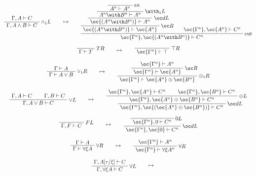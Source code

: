 \begin{gather*}
\\[2ex]
\AxRule{\Gamma,A\vdash C}
\LabelRule{\wedge_1 L}
\UnaRule{\Gamma,A\wedge B\vdash C}
\DisplayProof
\qquad\mapsto\qquad
\LabelRule{\rulename{ax}}
\NulRule{A^n\vdash A^n}
\LabelRule{\with_1 L}
\UnaRule{A^n\with B^n\vdash A^n}
\LabelRule{\oc d L}
\UnaRule{\oc{(A^n\with B^n)}\vdash A^n}
\LabelRule{\oc R}
\UnaRule{\oc{(A^n\with B^n)}\vdash \oc{A^n}}
\AxRule{\oc{\Gamma^n},\oc{A^n}\vdash C^n}
\LabelRule{\rulename{cut}}
\BinRule{\oc{\Gamma^n},\oc{(A^n\with B^n)}\vdash C^n}
\DisplayProof
\\[2ex]
\LabelRule{T R}
\NulRule{\Gamma\vdash T}
\DisplayProof
\qquad\mapsto\qquad
\LabelRule{\top R}
\NulRule{\oc{\Gamma^n}\vdash \top}
\DisplayProof
\\[2ex]
\AxRule{\Gamma\vdash A}
\LabelRule{\vee_1 R}
\UnaRule{\Gamma\vdash A\vee B}
\DisplayProof
\qquad\mapsto\qquad
\AxRule{\oc{\Gamma^n}\vdash A^n}
\LabelRule{\oc R}
\UnaRule{\oc{\Gamma^n}\vdash \oc{A^n}}
\LabelRule{\plus_1 R}
\UnaRule{\oc{\Gamma^n}\vdash \oc{A^n}\plus\oc{B^n}}
\DisplayProof
\\[2ex]
\AxRule{\Gamma,A\vdash C}
\AxRule{\Gamma,B\vdash C}
\LabelRule{\vee L}
\BinRule{\Gamma,A\vee B\vdash C}
\DisplayProof
\qquad\mapsto\qquad
\AxRule{\oc{\Gamma^n},\oc{A^n}\vdash C^n}
\AxRule{\oc{\Gamma^n},\oc{B^n}\vdash C^n}
\LabelRule{\plus L}
\BinRule{\oc{\Gamma^n},\oc{A^n}\plus\oc{B^n}\vdash C^n}
\LabelRule{\oc d L}
\UnaRule{\oc{\Gamma^n},\oc{(\oc{A^n}\plus\oc{B^n})}\vdash C^n}
\DisplayProof
\\[2ex]
\LabelRule{F L}
\NulRule{\Gamma,F\vdash C}
\DisplayProof
\qquad\mapsto\qquad
\LabelRule{\zero L}
\NulRule{\oc{\Gamma^n},\zero\vdash C^n}
\LabelRule{\oc d L}
\UnaRule{\oc{\Gamma^n},\oc{\zero}\vdash C^n}
\DisplayProof
\\[2ex]
\AxRule{\Gamma\vdash A}
\LabelRule{\forall R}
\UnaRule{\Gamma\vdash \forall\xi A}
\DisplayProof
\qquad\mapsto\qquad
\AxRule{\oc{\Gamma^n}\vdash A^n}
\LabelRule{\forall R}
\UnaRule{\oc{\Gamma^n}\vdash \forall\xi A^n}
\DisplayProof
\\[2ex]
\AxRule{\Gamma,A[\tau/\xi]\vdash C}
\LabelRule{\forall L}
\UnaRule{\Gamma,\forall\xi A\vdash C}
\DisplayProof
\qquad\mapsto\qquad
\LabelRule{\rulename{ax}}
\NulRule{A^n[\tau^n/\xi]\vdash A^n[\tau^n/\xi]}
\LabelRule{\forall L}
\UnaRule{\forall\xi A^n\vdash A^n[\tau^n/\xi]}
\LabelRule{\oc d L}
\UnaRule{\oc{\forall\xi A^n}\vdash A^n[\tau^n/\xi]}
\LabelRule{\oc R}
\UnaRule{\oc{\forall\xi A^n}\vdash \oc{(A^n[\tau^n/\xi])}}
\AxRule{\oc{\Gamma^n},\oc{(A^n[\tau^n/\xi])}\vdash C^n}
\LabelRule{\rulename{cut}}
\BinRule{\oc{\Gamma^n},\oc{\forall\xi A^n}\vdash C^n}

\end{gather*}
